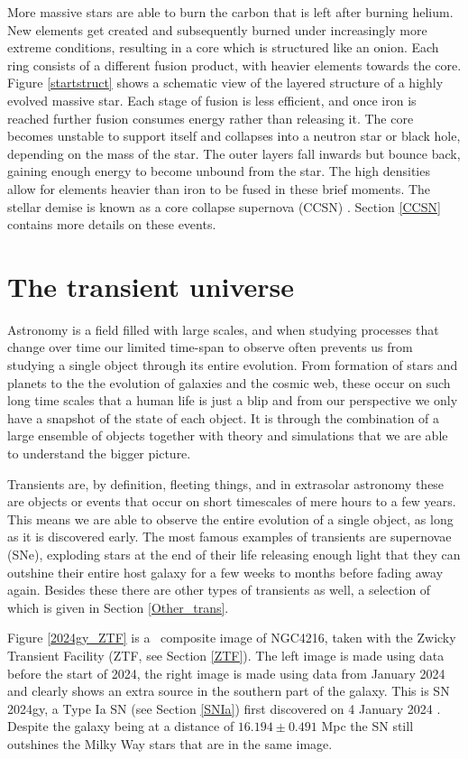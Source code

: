 \documentclass[a4paper,oneside,12pt, class=Latex/Classes/PhDthesisPSnPDF, crop=false]{standalone}
\begin{document}
More massive stars are able to burn the carbon that is left after burning helium. New elements get created and subsequently burned under increasingly more extreme conditions, resulting in a core which is structured like an onion. Each ring consists of a different fusion product, with heavier elements towards the core. Figure \ref{startstruct} shows a schematic view of the layered structure of a highly evolved massive star. Each stage of fusion is less efficient, and once iron is reached further fusion consumes energy rather than releasing it. The core becomes unstable to support itself and collapses into a neutron star or black hole, depending on the mass of the star. The outer layers fall inwards but bounce back, gaining enough energy to become unbound from the star. The high densities allow for elements heavier than iron to be fused in these brief moments. The stellar demise is known as a core collapse supernova (CCSN) \citep{starstruct}. Section \ref{CCSN} contains more details on these events.


\section{The transient universe}
Astronomy is a field filled with large scales, and when studying processes that change over time our limited time-span to observe often prevents us from studying a single object through its entire evolution. From formation of stars and planets to the the evolution of galaxies and the cosmic web, these occur on such long time scales that a human life is just a blip and from our perspective we only have a snapshot of the state of each object. It is through the combination of a large ensemble of objects together with theory and simulations that we are able to understand the bigger picture.

Transients are, by definition, fleeting things, and in extrasolar astronomy these are objects or events that occur on short timescales of mere hours to a few years. This means we are able to observe the entire evolution of a single object, as long as it is discovered early. The most famous examples of transients are supernovae (SNe), exploding stars at the end of their life releasing enough light that they can outshine their entire host galaxy for a few weeks to months before fading away again. Besides these there are other types of transients as well, a selection of which is given in Section \ref{Other_trans}.

Figure \ref{2024gy_ZTF} is a \ztfg\ztfr\ztfi\ composite image of NGC4216, taken with the Zwicky Transient Facility (ZTF, see Section \ref{ZTF}). The left image is made using data before the start of 2024, the right image is made using data from January 2024 and clearly shows an extra source in the southern part of the galaxy. This is SN 2024gy, a Type Ia SN (see Section \ref{SNIa}) first discovered on 4 January 2024 \citep{2024gy_disc}. Despite the galaxy being at a distance of $16.194 \pm 0.491$ Mpc \citep{2024gy_z} the SN still outshines the Milky Way stars that are in the same image.
\end{document}
